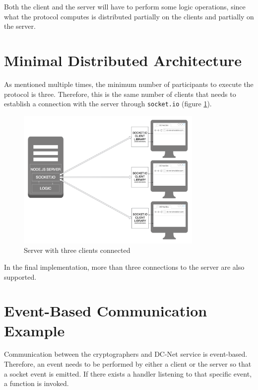 Both the client and the server will have to perform some logic operations, since what the protocol computes is distributed partially on the clients and partially on the server.

\section{Minimal Distributed Architecture}

As mentioned multiple times, the minimum number of participants to execute the protocol is three. Therefore, this is the same number of clients that needs to establish a connection with the server through \lstinline{socket.io} (figure \ref{fig:distrubtedArchitecture}).

\begin{figure}[H]
    \centering
    \includegraphics[width=0.8\textwidth]{Images/Design/distributedArchitecture.png}
    \caption{Server with three clients connected}
    \label{fig:distrubtedArchitecture}
\end{figure}

In the final implementation, more than three connections to the server are also supported.

\section{Event-Based Communication Example}
Communication between the cryptographers and DC-Net service is event-based. Therefore, an event needs to be performed by either a client or the server so that a socket event is emitted. If there exists a handler listening to that specific event, a function is invoked. 

